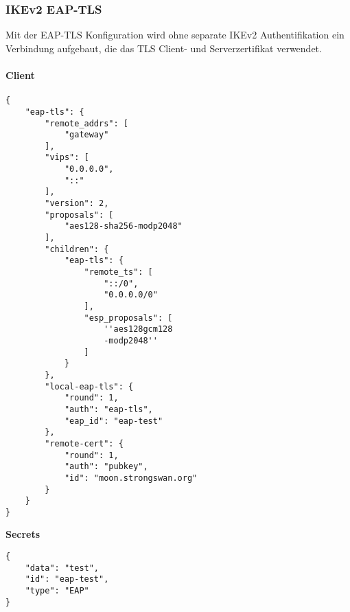 \subsubsection{IKEv2 EAP-TLS}
Mit der EAP-TLS Konfiguration wird ohne separate IKEv2 Authentifikation ein Verbindung aufgebaut, die das TLS Client- und Serverzertifikat verwendet.\\
\noindent\begin{minipage}[t]{0.5\textwidth}
\vspace{0pt}
\paragraph{Client}\mbox{}\medskip
\begin{lstlisting}[style=BashInputStyle]
{
    "eap-tls": {
        "remote_addrs": [
            "gateway"
        ],
        "vips": [
            "0.0.0.0",
            "::"
        ],
        "version": 2,
        "proposals": [
            "aes128-sha256-modp2048"
        ],
        "children": {
            "eap-tls": {
                "remote_ts": [
                    "::/0",
                    "0.0.0.0/0"
                ],
                "esp_proposals": [
                    ''aes128gcm128
                    -modp2048''
                ]
            }
        },
        "local-eap-tls": {
            "round": 1,
            "auth": "eap-tls",
            "eap_id": "eap-test"
        },
        "remote-cert": {
            "round": 1,
            "auth": "pubkey",
            "id": "moon.strongswan.org"
        }
    }
}
\end{lstlisting}
\hspace*{18pt}\textbf{Secrets}\mbox{}\medskip
\begin{lstlisting}[style=BashInputStyle]
{
    "data": "test",
    "id": "eap-test",
    "type": "EAP"
}
\end{lstlisting}
\end{minipage}
\hfill
